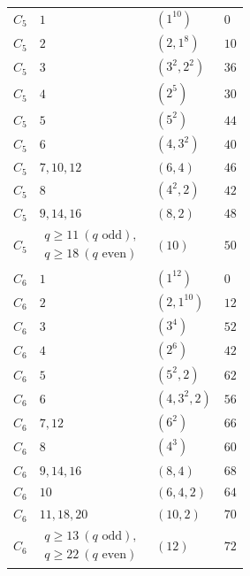 \documentclass[11pt,a4paper]{amsart}
\numberwithin{equation}{section}
\theoremstyle{definition}
\theoremstyle{remark}
\begin{document}
{\begin{longtable}{@{}p{}p{}p{}p{}@{}}
$C_{5}$&$1$&$(1^{10})$&$0$\\
$C_{5}$&$2$&$(2,1^{8})$&$10$\\
$C_{5}$&$3$&$(3^{2},2^{2})$&$36$\\
$C_{5}$&$4$&$(2^{5})$&$30$\\
$C_{5}$&$5$&$(5^{2})$&$44$\\
$C_{5}$&$6$&$(4,3^{2})$&$40$\\
$C_{5}$&$7,10,12$&$(6,4)$&$46$\\
$C_{5}$&$8$&$(4^{2},2)$&$42$\\
$C_{5}$&$9,14,16$&$(8,2)$&$48$\\
$C_{5}$&$\begin{gathered}q\ge 11\ (q\text{ odd}),\\q\ge 18\ (q\text{ even})\end{gathered}$&$(10)$&$50$\\ \midrule
$C_{6}$&$1$&$(1^{12})$&$0$\\
$C_{6}$&$2$&$(2,1^{10})$&$12$\\
$C_{6}$&$3$&$(3^{4})$&$52$\\
$C_{6}$&$4$&$(2^{6})$&$42$\\
$C_{6}$&$5$&$(5^{2},2)$&$62$\\
$C_{6}$&$6$&$(4,3^{2},2)$&$56$\\
$C_{6}$&$7,12$&$(6^{2})$&$66$\\
$C_{6}$&$8$&$(4^{3})$&$60$\\
$C_{6}$&$9,14,16$&$(8,4)$&$68$\\
$C_{6}$&$10$&$(6,4,2)$&$64$\\
$C_{6}$&$11,18,20$&$(10,2)$&$70$\\
$C_{6}$&$\begin{gathered}q\ge 13\ (q\text{ odd}),\\q\ge 22\ (q\text{ even})\end{gathered}$&$(12)$&$72$\\
\end{longtable}
}
\end{document}

